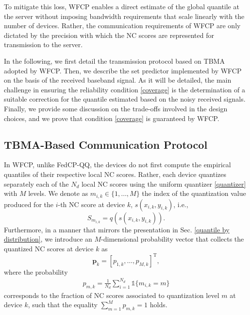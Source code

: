 \documentclass[12pt, draftclsnofoot, onecolumn]{IEEEtran}
\begin{document}
To mitigate this loss, WFCP enables a direct estimate of the global quantile at the server without imposing bandwidth requirements that scale linearly with the number of devices. Rather, the communication requirements of WFCP are only dictated by the precision with which the NC scores are represented for transmission to the server.


In the following, we first detail the transmission protocol based on TBMA adopted by WFCP. Then, we describe the set predictor implemented by WFCP on the basis of the received baseband signal. As it will be detailed, the main challenge in ensuring the reliability condition \eqref{coverage} is the determination of a suitable correction for the quantile estimated based on the noisy received signals. Finally, we provide some discussion on the trade-offs involved in the design choices, and we prove that condition \eqref{coverage} is guaranteed by WFCP.

\subsection{TBMA-Based Communication Protocol}\label{scheme}
In WFCP, unlike FedCP-QQ, the devices do not first compute the empirical quantiles of their respective local NC scores. Rather, each device quantizes separately each of the $N_d$ local NC scores using the uniform quantizer \eqref{quantizer} with $M$ levels. We denote as $m_{i,k}\in\{1,\ldots,M\}$ the index of the quantization value produced for the $i$-th NC score at device $k$, $s(x_{i,k},y_{i,k})$, i.e.,
\begin{equation}
    S_{m_{i,k}}=q(s(x_{i,k},y_{i,k})).
\end{equation}
Furthermore, in a manner that mirrors the presentation in Sec. \ref{quantile by distribution}, we introduce an $M$-dimensional probability vector that collects the quantized NC scores at device $k$ as
\begin{equation}\label{eq:pk}
    \boldsymbol{p}_k=[p_{1,k},\dots,p_{M,k}]^{\mathrm{T}},
\end{equation}
where the probability
\begin{align}
    p_{m,k}=\frac{1}{N_d}\sum^{N_d}_{i=1}\mathds{1}\{m_{i,k}=m\}
\end{align}
corresponds to the fraction of NC scores associated to quantization level $m$ at device $k$, such that the equality $\sum_{m=1}^M p_{m,k}=1$ holds.
\end{document}
